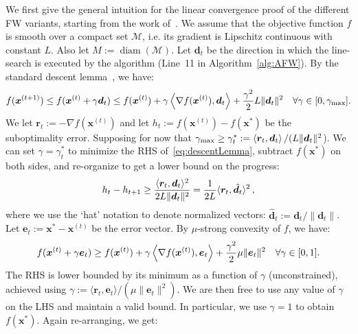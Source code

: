 \documentclass{article} %
\DeclareMathOperator{\diam}{diam}
\newcommand{\domain}{\mathcal{M}} %
\newcommand{\stepsize}{\gamma}
\newcommand{\stepmax}{\stepsize_{\textnormal{\scriptsize max}}} %
\newcommand{\x}{\bm{x}}
\newcommand{\dd}{\bm{d}}
\renewcommand{\r}{\bm{r}}
\newcommand{\innerProd}[2]{\left\langle #1 , #2 \right\rangle}
\newcommand{\innerProdCompressed}[2]{\langle #1 , #2 \rangle}
\newcommand{\err}{\bm{e}} %
\newcommand{\0}{\mathbf{0}} %
\begin{document}
We first give the general intuition for the linear convergence proof of the
different FW variants, starting from the work of~\citet{Guelat:1986fq}.
We assume that the objective function $f$ is smooth over a compact set $\domain$, i.e. its gradient is Lipschitz continuous with constant $L$. Also let $M := \diam(\domain)$. Let
$\dd_t$ be the direction in which the line-search is executed by the
algorithm (Line~11 in Algorithm~\ref{alg:AFW}). By the standard descent
lemma~\citep[see e.g. (1.2.5) in][]{Nesterov:2004:lectures}, we have:\vspace{-0.5mm}
\begin{equation} \label{eq:descentLemma}
f(\x^{(t+1)}) \leq f(\x^{(t)}+\stepsize \dd_t) \leq f(\x^{(t)}) + \stepsize
\innerProd{\nabla f(\x^{(t)})}{\dd_t} + \frac{\stepsize^2}{2} L \| \dd_t \|^2
\quad \forall \stepsize \in [0, \stepmax].
\end{equation}
We let $\r_t := - \nabla f(\x^{(t)})$ and let $h_t := f(\x^{(t)}) - f(\x^*)$
be the suboptimality error. Supposing for now that $\stepmax \geq
\stepsize_t^* :=  \innerProd{\r_t}{\dd_t} / (L \|\dd_t\|^2$). We can set
$\stepsize = \stepsize_t^*$ to minimize the RHS of~\eqref{eq:descentLemma},
subtract $f(\x^*)$ on both sides, and re-organize to get a lower bound on the
progress:\vspace{-0.5mm}
\begin{equation} \label{eq:lowerProgress}
h_t- h_{t+1} \geq \frac{\innerProdCompressed{\r_t}{\dd_t}^2}{2 L
\|\dd_t\|^2} 
= \frac{1}{2L} \innerProdCompressed{\r_t}{\hat{\dd}_t}^2 \, , \vspace{-0.5mm}
%
\end{equation}
where we use the `hat' notation to denote normalized vectors: $\hat{\dd}_t := \dd_t / \|\dd_t \|$. 
Let $\err_t := \x^* - \x^{(t)}$ be the error vector. By $\mu$-strong
convexity of $f$, we have:\vspace{-1mm}
\begin{equation} \label{eq:strongLower}
f(\x^{(t)} + \stepsize \err_t) \geq f(\x^{(t)}) + \stepsize \innerProd{\nabla
f(\x^{(t)})}{\err_t} + \frac{\stepsize^2}{2} \mu \| \err_t \|^2 \quad \forall
\stepsize \in [0,1].\vspace{-0.5mm}
\end{equation}
The RHS is lower bounded by its minimum as a function of $\stepsize$
(unconstrained), achieved using $\stepsize := \innerProdCompressed{\r_t}{\err_t} / (\mu \| \err_t \|^2)$.
We are then free to use any
value of $\stepsize$ on the LHS and maintain a valid bound. In particular, we
use $\stepsize = 1$ to obtain $f(\x^*)$. Again re-arranging, we get:\vspace{-0.5mm}
\end{document}
